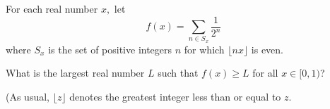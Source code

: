For each real number $x,$ let \[f(x)=\sum_{n\in S_x}\frac1{2^n}\]where $S_x$ is the set of positive integers $n$ for which $\lfloor nx\rfloor$ is even.

What is the largest real number $L$ such that $f(x)\ge L$ for all $x\in [0,1)$?

(As usual, $\lfloor z\rfloor$ denotes the greatest integer less than or equal to $z.$
